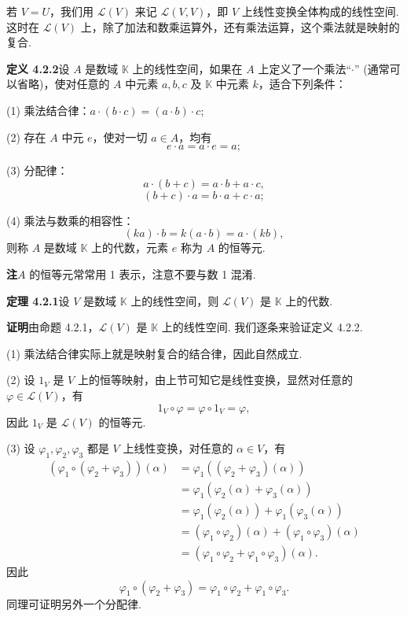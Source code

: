 \documentclass[UTF8, 12pt, fontset=fandol, oneside]{ctexart}
\begin{document}
若 $V=U$，我们用 $\mathcal{L}(V)$ 来记 $\mathcal{L}(V,V)$，即 $V$ 上线性变换全体构成的线性空间. 这时在 $\mathcal{L}(V)$ 上，除了加法和数乘运算外，还有乘法运算，这个乘法就是映射的复合.

\noindent\textbf{定义 4.2.2}\quad 设 $A$ 是数域 $\mathbb{K}$ 上的线性空间，如果在 $A$ 上定义了一个乘法“$\cdot$” (通常可以省略)，使对任意的 $A$ 中元素 $a,b,c$ 及 $\mathbb{K}$ 中元素 $k$，适合下列条件：

(1) 乘法结合律：$a\cdot(b\cdot c)=(a\cdot b)\cdot c$;

(2) 存在 $A$ 中元 $e$，使对一切 $a\in A$，均有
\[
e\cdot a=a\cdot e=a;
\]

(3) 分配律：
\[
a\cdot(b+c)=a\cdot b+a\cdot c,
\]
\[
(b+c)\cdot a=b\cdot a+c\cdot a;
\]

(4) 乘法与数乘的相容性：
\[
(ka)\cdot b=k(a\cdot b)=a\cdot(kb),
\]
则称 $A$ 是数域 $\mathbb{K}$ 上的代数，元素 $e$ 称为 $A$ 的恒等元.

\noindent\textbf{注}\quad $A$ 的恒等元常常用 1 表示，注意不要与数 1 混淆.

\noindent\textbf{定理 4.2.1}\quad 设 $V$ 是数域 $\mathbb{K}$ 上的线性空间，则 $\mathcal{L}(V)$ 是 $\mathbb{K}$ 上的代数.

\noindent\textbf{证明}\quad 由命题 4.2.1，$\mathcal{L}(V)$ 是 $\mathbb{K}$ 上的线性空间. 我们逐条来验证定义 4.2.2.

(1) 乘法结合律实际上就是映射复合的结合律，因此自然成立.

(2) 设 $1_V$ 是 $V$ 上的恒等映射，由上节可知它是线性变换，显然对任意的 $\varphi\in\mathcal{L}(V)$，有
\[
1_V\circ\varphi=\varphi\circ 1_V=\varphi,
\]
因此 $1_V$ 是 $\mathcal{L}(V)$ 的恒等元.

(3) 设 $\varphi_1,\varphi_2,\varphi_3$ 都是 $V$ 上线性变换，对任意的 $\alpha\in V$，有
\[
\begin{aligned}
(\varphi_1\circ(\varphi_2+\varphi_3))(\alpha)
&=\varphi_1((\varphi_2+\varphi_3)(\alpha))\\
&=\varphi_1(\varphi_2(\alpha)+\varphi_3(\alpha))\\
&=\varphi_1(\varphi_2(\alpha))+\varphi_1(\varphi_3(\alpha))\\
&=(\varphi_1\circ\varphi_2)(\alpha)+(\varphi_1\circ\varphi_3)(\alpha)\\
&=(\varphi_1\circ\varphi_2+\varphi_1\circ\varphi_3)(\alpha).
\end{aligned}
\]
因此
\[
\varphi_1\circ(\varphi_2+\varphi_3)=\varphi_1\circ\varphi_2+\varphi_1\circ\varphi_3.
\]
同理可证明另外一个分配律.
\end{document}

